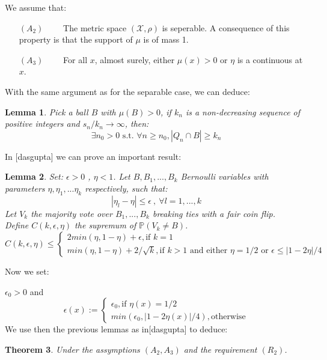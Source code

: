 \documentclass[onecolumn,12pt]{article}
\newtheorem{theorem}{Theorem}[section]
\newtheorem{lemma}[theorem]{Lemma}
\begin{document}
We assume that:
\begin{itemize}
\item[$(A_2)$] \ \ \ \ The metric space $(\mathscr{X},\rho)$ is seperable. A consequence of this property is that the support of $\mu$ is of mass 1.
\item[$(A_3)$] \ \ \ \ For all $x$, almost surely, either $\mu({x})>0$ or $\eta$ is a continuous at $x$. 
\end{itemize}

With the same argument as for the separable case, we can deduce:

\begin{lemma}
Pick a ball $B$ with $\mu(B)>0$, if $k_n$ is a non-decreasing sequence of positive integers and $s_n/k_n \rightarrow \infty$, then:
$$\exists n_0>0 \text{ s.t. } \forall n\geq n_0 , |Q_n \cap B| \geq k_n$$
\end{lemma}

In [dasgupta] we can prove an important result: 

\begin{lemma}
Set: $\epsilon>0$ , $\eta<1$. Let $B,B_1,...,B_k $ Bernoulli variables with parameters $\eta,\eta_1, ... \eta_k$ respectively, such that:
$$|\eta_l-\eta|\leq \epsilon \ ,\ \forall l=1,...,k$$
Let $V_k$ the majority vote over $B_1,...,B_k$ breaking ties with a fair coin flip.\\
Define $C(k,\epsilon,\eta)$ the supremum of $\mathbb{P}(V_k \neq B)$. 
$$C(k,\epsilon,\eta)\leq 
\begin{cases}
2 min(\eta,1-\eta)+\epsilon , \text{if } k=1\\
 min(\eta,1-\eta)+2/\sqrt{k} , \text{if } k>1 \text{ and either }\eta =1/2\text{ or } \epsilon \leq |1-2\eta|/4 
\end{cases}$$
\end{lemma}

Now we set:

$\epsilon_0>0$
and
$$\epsilon(x):=
\begin{cases}
\epsilon_0, \text{if } \eta(x)=1/2 \\
min(\epsilon_0,|1-2\eta(x)|/4 ) , \text{otherwise}
\end{cases}
$$
We use then the previous lemmas as in[dasgupta] to deduce:
\begin{theorem}
Under the assymptions $(A_2,A_3)$ and the requirement $(R_2)$.
\end{theorem}
\end{document}
